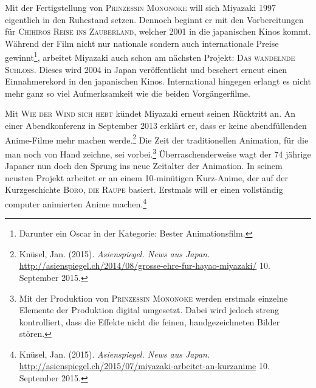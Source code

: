 Mit der Fertigstellung von \textsc{Prinzessin Mononoke} will sich Miyazaki 1997 eigentlich in den Ruhestand setzen. Dennoch beginnt er mit den Vorbereitungen für \textsc{Chihiros Reise ins Zauberland}, welcher 2001 in die japanischen Kinos kommt. Während der Film nicht nur nationale sondern auch internationale Preise gewinnt\footnote{Darunter ein Oscar in der Kategorie: Bester Animationsfilm.}, arbeitet Miyazaki auch schon am nächsten Projekt: \textsc{Das wandelnde Schloss}. Dieses wird 2004 in Japan veröffentlicht und beschert erneut einen Einnahmerekord in den japanischen Kinos. International hingegen erlangt es nicht mehr ganz so viel Aufmerksamkeit wie die beiden Vorgängerfilme. 

Mit \textsc{Wie der Wind sich hebt} kündet Miyazaki erneut seinen Rücktritt an. An einer Abendkonferenz in September 2013 erklärt er, dass er keine abendfüllenden Anime-Filme mehr machen werde.\footnote{Knüsel, Jan. (2015). \emph{Asienspiegel. News aus Japan.}\\ \url{http://asienspiegel.ch/2014/08/grosse-ehre-fur-hayao-miyazaki/} 10. September 2015.} Die Zeit der traditionellen Animation, für die man noch von Hand zeichne, sei vorbei.\footnote{Mit der Produktion von \textsc{Prinzessin Mononoke} werden erstmals einzelne Elemente der Produktion digital umgesetzt. Dabei wird jedoch streng kontrolliert, dass die Effekte nicht die feinen, handgezeichneten Bilder stören.} Überraschenderweise wagt der 74 jährige Japaner nun doch den Sprung ins neue Zeitalter der Animation. In seinem neusten Projekt arbeitet er an einem 10-minütigen Kurz-Anime, der auf der Kurzgeschichte \textsc{Boro, die Raupe} basiert. Erstmals will er einen vollständig computer animierten Anime machen.\footnote{Knüsel, Jan. (2015). \emph{Asienspiegel. News aus Japan.}\\ \url{http://asienspiegel.ch/2015/07/miyazaki-arbeitet-an-kurzanime} 10. September 2015.}